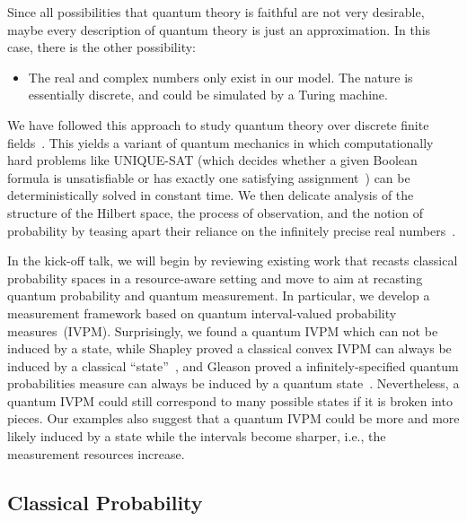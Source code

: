 \documentclass{article}
\theoremstyle{remark}
\begin{document}
Since all possibilities that quantum theory is faithful are not very
desirable, maybe every description of quantum theory is just an approximation.
In this case, there is the other possibility:
\begin{itemize}
\item The real and complex numbers only exist in our model. The nature is
essentially discrete, and could be simulated by a Turing machine.
\end{itemize}
We have followed this approach to study quantum theory over discrete
finite fields~\cite{usat,geometry2013,DQT2014}. This yields a variant
of quantum mechanics in which computationally hard problems like UNIQUE-SAT
(which decides whether a given Boolean formula is unsatisfiable or
has exactly one satisfying assignment~\cite{Valiant198685,Papadimitriou1993,AroraBarak2009})
can be deterministically solved in constant time. We then delicate
analysis of the structure of the Hilbert space, the process of observation,
and the notion of probability by teasing apart their reliance on the
infinitely precise real numbers~\cite{geometry2013,DQT2014}.
















In the kick-off talk, we will begin by reviewing existing work that
recasts classical probability spaces in a resource-aware setting and
move to aim at recasting quantum probability and quantum measurement.
In particular, we develop a measurement framework based on quantum
interval-valued probability measures~(IVPM). Surprisingly, we found
a quantum IVPM which can not be induced by a state, while Shapley
proved a classical convex IVPM can always be induced by a classical
``state''~\cite{Shapley1971,Grabisch2016}, and Gleason proved
a infinitely-specified quantum probabilities measure can always be
induced by a quantum state~\cite{gleason1957,Redhead1987-REDINA,peres1995quantum}.
Nevertheless, a quantum IVPM could still correspond to many possible
states if it is broken into pieces. Our examples also suggest that
a quantum IVPM could be more and more likely induced by a state while
the intervals become sharper, i.e., the measurement resources increase.

\subsection{Classical Probability}
\end{document}
